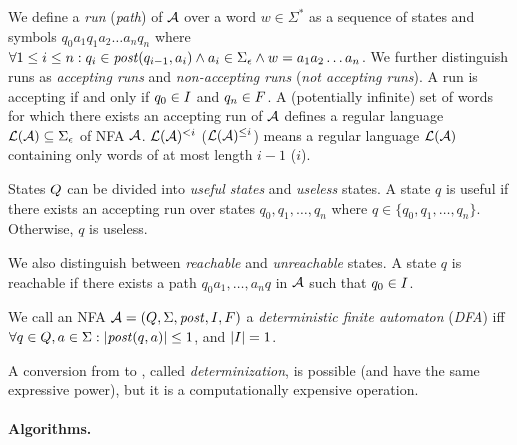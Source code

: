 We define a \emph{run} (\emph{path}) of $\mathcal{A}$ over a word $w \in \Sigma^*$ as a sequence of states and symbols $q_0a_1q_1a_2\ldots a_nq_n$ where $\forall 1 \leq i \leq n: q_i \in \mathit{post}(q_{i-1}, a_i) \land a_i \in \Sigma_\epsilon \land w = a_1a_2\ldots a_n$.
We further distinguish runs as \emph{accepting runs} and \emph{non-accepting runs} (\emph{not accepting runs}).
A run is accepting if and only if $q_0 \in I$ and $q_n \in F$.
A (potentially infinite) set of words for which there exists an accepting run of $\mathcal{A}$ defines a regular language $\mathcal{L}(\mathcal{A}) \subseteq \Sigma_\epsilon$ of NFA $\mathcal{A}$. $\mathcal{L}(\mathcal{A})^{<i}$ ($\mathcal{L}(\mathcal{A})^{\leq i}$) means a regular language $\mathcal{L}(\mathcal{A})$ containing only words of at most length $i - 1$ ($i$).

States $Q$ can be divided into \emph{useful states} and \emph{useless} states.
A state $q$ is useful if there exists an accepting run over states $q_0, q_1, \ldots, q_n$ where $q \in \{ q_0, q_1, \ldots, q_n \}$.
Otherwise, $q$ is useless.

We also distinguish between \emph{reachable} and \emph{unreachable} states.
A state $q$ is reachable if there exists a path $q_0a_1, \ldots, a_nq$ in $\mathcal{A}$ such that $q_0 \in I$.


\begin{definition} \hfill \newline
We call an NFA $\mathcal{A} = (Q, \Sigma
, \mathit{post}, I, F)$ a \emph{deterministic finite automaton} (\emph{DFA}) iff
\\$\forall q \in Q, a \in \Sigma: |\mathit{post}(q, a)| \leq 1
$, and $|I| = 1$.
\end{definition}

A conversion from \nfa to \dfa, called \emph{determinization}, is possible (\nfas and \dfas have the same expressive power), but it is a computationally expensive operation.

\paragraph{Algorithms.}

